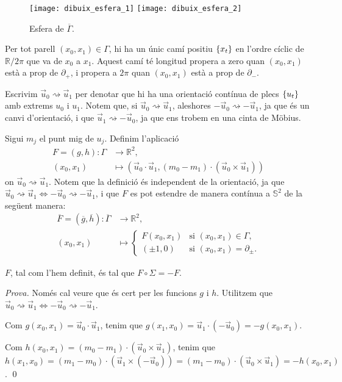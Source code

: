 \begin{figure}[htbp]
    \centering
    \texttt{[image: dibuix\_esfera\_1]}
    \raisebox{5\height}{$\quad\quad\Large\cong\quad$}
    \texttt{[image: dibuix\_esfera\_2]}
    \caption{Esfera de $\overline{\Gamma}$.}
    \label{fig:esfera}
\end{figure}

Per tot parell $(x_0,x_1)\in{\Gamma}$, hi ha un únic camí positiu $\{x_t\}$ en l'ordre cíclic de $\mathbb R/2\pi$ que va de $x_0$ a $x_1$. Aquest camí té longitud propera a zero quan $(x_0,x_1)$ està a prop de $\partial_+$, i propera a $2\pi$ quan $(x_0,x_1)$ està a prop de $\partial_-$.

Escrivim $\vec u_0\rightsquigarrow\vec u_1$ per denotar que hi ha una orientació contínua de plecs $\{u_t\}$ amb extrems $u_0$ i $u_1$. Notem que, si $\vec u_0\rightsquigarrow\vec u_1$, aleshores $-\vec u_0\rightsquigarrow-\vec u_1$, ja que és un canvi d'orientació, i que $\vec u_1\rightsquigarrow-\vec u_0$, ja que ens trobem en una cinta de Möbius. 

Sigui $m_j$ el punt mig de $u_j$. Definim l'aplicació
\begin{align*}
    F=(g,h): {\Gamma}&\to\mathbb R^2,\\
    (x_0,x_1)&\mapsto(\vec u_0\cdot\vec u_1, (m_0- m_1)\cdot(\vec u_0\times\vec u_1))
\end{align*}
on $\vec u_0\rightsquigarrow\vec u_1$. Notem que la definició és independent de la orientació, ja que $\vec u_0\rightsquigarrow\vec u_1\iff-\vec u_0\rightsquigarrow-\vec u_1$, i que $F$ es pot estendre de manera contínua a $\mathbb S^2$ de la següent manera:
\begin{align*}
    \overline{F}=(\overline{g},\overline{h}): \overline{\Gamma}&\to\mathbb R^2,\\
    (x_0,x_1)&\mapsto\begin{cases}
        F(x_0,x_1) & \text{si } (x_0,x_1)\in{\Gamma},\\
        (\pm 1,0) & \text{si } (x_0,x_1)={\partial_\pm}.
    \end{cases}
\end{align*}

\begin{prop}
    $F$, tal com l'hem definit, és tal que $F\circ\Sigma = -F$.
\end{prop}
{
    \color{green!50!black}
    \textit{Prova.}
    Només cal veure que és cert per les funcions $g$ i $h$. Utilitzem que $\vec u_0\rightsquigarrow\vec u_1\iff-\vec u_0\rightsquigarrow-\vec u_1$.

    Com $g(x_0,x_1) = \vec u_0\cdot\vec u_1$, tenim que $g(x_1,x_0) = \vec u_1 \cdot (-\vec u_0) = -g(x_0,x_1)$.

    Com $h(x_0,x_1) = (m_0- m_1)\cdot(\vec u_0\times\vec u_1)$, tenim que $h(x_1,x_0) = (m_1- m_0)\cdot(\vec u_1\times(-\vec u_0)) = (m_1- m_0)\cdot(\vec u_0\times\vec u_1) = -h(x_0,x_1)$.
    \qed
}

